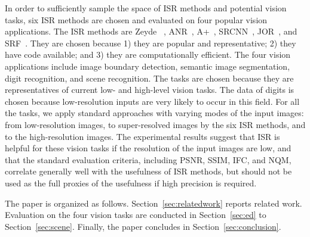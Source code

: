
In order to sufficiently sample the space of ISR methods and potential
vision tasks, six ISR methods are chosen and evaluated on four popular
vision applications. The ISR methods are Zeyde
\etal~\cite{Zeyde-CS-2012}, ANR~\cite{Timofte-ICCV-2013},
A+~\cite{Timofte-ACCV-2014}, SRCNN~\cite{Dong-ECCV-2014}, 
JOR~\cite{JOR:EG15}, and SRF~\cite{SR_forest}.
They are chosen because 1) they are popular and representative; 
2) they have code available; and 3) they are computationally efficient.  
The four vision applications include image boundary detection, semantic image segmentation, 
digit recognition, and scene recognition. The tasks are chosen because they are representatives of
current low- and high-level vision tasks. The data of digits is chosen because low-resolution 
inputs are very likely to occur in this field. For all the tasks, we apply 
standard approaches with varying modes of the input images: from
low-resolution images, to super-resolved images by
the six ISR methods, and to the high-resolution images. The experimental
results suggest that ISR is helpful for these vision
tasks if the resolution of the input images are low, and that the
standard evaluation criteria, including PSNR, SSIM, IFC, and NQM, correlate generally well with
the usefulness of ISR methods, but should not be used as the full proxies of the usefulness 
if high precision is required.

The paper is organized as follows. Section~\ref{sec:relatedwork}
reports related work. Evaluation on the four vision tasks are
conducted in Section~\ref{sec:ed} to Section~\ref{sec:scene}. Finally,
the paper concludes in Section~\ref{sec:conclusion}.

